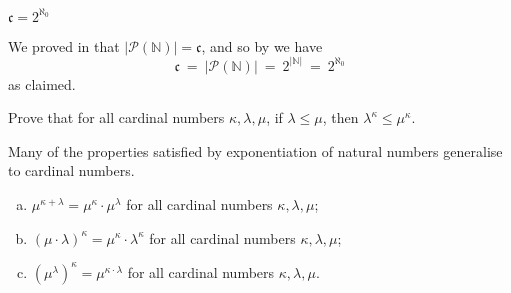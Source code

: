 \begin{corollary}
$\mathfrak{c} = 2^{\aleph_0}$
\end{corollary}

\begin{cproof}
We proved in  that $|\mathcal{P}(\mathbb{N})| = \mathfrak{c}$, and so by  we have
\[ \mathfrak{c} ~=~ |\mathcal{P}(\mathbb{N})| ~=~ 2^{|\mathbb{N}|} ~=~ 2^{\aleph_0} \]
as claimed.
\end{cproof}

\begin{exercise}
\label{exCardinalExponentiationIsMonotone}
Prove that for all cardinal numbers $\kappa, \lambda, \mu$, if $\lambda \le \mu$, then $\lambda^{\kappa} \le \mu^{\kappa}$.
\end{exercise}

Many of the properties satisfied by exponentiation of natural numbers generalise to cardinal numbers.

\begin{theorem}
\label{thmPropertiesOfCardinalExponentiation}
\fixlistskip
\begin{enumerate}[(a)]
\item $\mu^{\kappa + \lambda} = \mu^{\kappa} \cdot \mu^{\lambda}$ for all cardinal numbers $\kappa, \lambda, \mu$;
\item $(\mu \cdot \lambda)^{\kappa} = \mu^{\kappa} \cdot \lambda^{\kappa}$ for all cardinal numbers $\kappa, \lambda, \mu$;
\item $(\mu^{\lambda})^{\kappa} = \mu^{\kappa \cdot \lambda}$ for all cardinal numbers $\kappa, \lambda, \mu$.
\end{enumerate}
\end{theorem}

